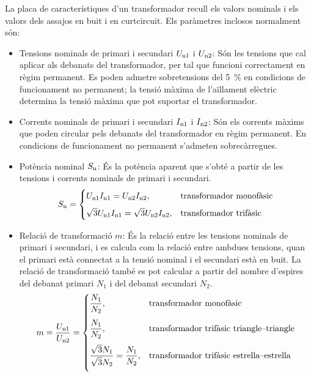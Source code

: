 La  placa de característiques d'un transformador recull els valors nominals  i els valors dels assajos
en buit i en curtcircuit. Els paràmetres inclosos normalment són:
\begin{itemize}
   \item Tensions nominals de primari i secundari  $U_\mathrm{n1}$ i $U_\mathrm{n2}$: Són les tensions que cal aplicar als debanats del transformador, per tal que funcioni correctament en règim permanent. Es poden admetre sobretensions del \SI{5}{\percent} en condicions de funcionament no permanent; la tensió màxima de l'aïllament elèctric determina la tensió màxima que pot suportar el transformador.
   \item Corrents nominals de primari i secundari  $I_\mathrm{n1}$ i $I_\mathrm{n2}$: Són els corrents màxims que poden circular pels debanats del transformador en règim permanent. En condicions de funcionament no permanent s'admeten sobrecàrregues.
   \item Potència nominal $S_\mathrm{n}$: És la potència aparent que s'obté a partir de les tensions i corrents nominals de primari i secundari.
       \begin{equation}
        S_\mathrm{n} = \begin{cases} U_\mathrm{n1} I_\mathrm{n1} = U_\mathrm{n2} I_\mathrm{n2}, & \text{transformador monofàsic} \\[2mm]
        \sqrt{3} U_\mathrm{n1} I_\mathrm{n1} = \sqrt{3} U_\mathrm{n2} I_\mathrm{n2}, & \text{transformador trifàsic} \end{cases}
       \end{equation}
   \item Relació de transformació $m$: És la relació entre les tensions nominals de primari i secundari, i es calcula com la relació entre ambdues tensions, quan el primari està connectat a la tensió nominal i el secundari està en buit. La relació de  transformació també es pot calcular a partir del nombre d'espires del debanat primari $N_1$ i del debanat secundari $N_2$.
       \begin{equation}
        m = \frac{U_\mathrm{n1}}{U_\mathrm{n2}} =  \begin{cases}
        \dfrac{N_1}{N_2}, & \text{transformador monofàsic} \\[0.4cm]
        \dfrac{N_1}{N_2}, & \text{transformador trifàsic triangle--triangle} \\[0.4cm]
        \dfrac{\sqrt{3}N_1}{\sqrt{3}N_2} = \dfrac{N_1}{N_2}, & \text{transformador trifàsic estrella--estrella} \\[0.4cm]

\end{cases}
\end{equation}
\end{itemize}

